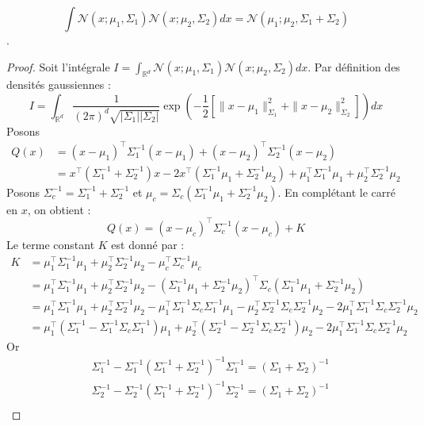 \documentclass[12pt]{article}
\begin{document}
\begin{lemma}
    \label{lem:prod_gaussians}
    $$\int \mathcal{N}(x; \mu_1, \Sigma_1) \mathcal{N}(x; \mu_2, \Sigma_2) dx = \mathcal{N}(\mu_1; \mu_2, \Sigma_1 + \Sigma_2)$$.
\end{lemma}
\begin{proof}
Soit l'intégrale $I = \int_{\mathbb{R}^d} \mathcal{N}(x; \mu_1, \Sigma_1) \mathcal{N}(x; \mu_2, \Sigma_2) dx$. Par définition des densités gaussiennes :
$$
I = \int_{\mathbb{R}^d} \frac{1}{(2\pi)^d \sqrt{|\Sigma_1||\Sigma_2|}} \exp \left( -\frac{1}{2} \left[ \|x-\mu_1\|_{\Sigma_1}^2 + \|x-\mu_2\|_{\Sigma_2}^2 \right] \right) dx
$$
Posons
\begin{align*}
Q(x) &= (x-\mu_1)^\top \Sigma_1^{-1} (x-\mu_1) + (x-\mu_2)^\top \Sigma_2^{-1} (x-\mu_2) \\
&= x^\top (\Sigma_1^{-1} + \Sigma_2^{-1}) x - 2x^\top (\Sigma_1^{-1}\mu_1 + \Sigma_2^{-1}\mu_2) + \mu_1^\top \Sigma_1^{-1} \mu_1 + \mu_2^\top \Sigma_2^{-1} \mu_2
\end{align*}
Posons $\Sigma_c^{-1} = \Sigma_1^{-1} + \Sigma_2^{-1}$ et $\mu_c = \Sigma_c (\Sigma_1^{-1}\mu_1 + \Sigma_2^{-1}\mu_2)$. En complétant le carré en $x$, on obtient :
$$
Q(x) = (x-\mu_c)^\top \Sigma_c^{-1} (x-\mu_c) + K
$$
Le terme constant $K$ est donné par :
\begin{align*}
K &= \mu_1^\top \Sigma_1^{-1} \mu_1 + \mu_2^\top \Sigma_2^{-1} \mu_2 - \mu_c^\top \Sigma_c^{-1} \mu_c\\
&= \mu_1^\top \Sigma_1^{-1} \mu_1 + \mu_2^\top \Sigma_2^{-1} \mu_2 
- (\Sigma_1^{-1}\mu_1 + \Sigma_2^{-1}\mu_2)^\top \Sigma_c (\Sigma_1^{-1}\mu_1 + \Sigma_2^{-1}\mu_2) \\
&= \mu_1^\top \Sigma_1^{-1} \mu_1 + \mu_2^\top \Sigma_2^{-1} \mu_2
- \mu_1^\top \Sigma_1^{-1} \Sigma_c \Sigma_1^{-1} \mu_1
- \mu_2^\top \Sigma_2^{-1} \Sigma_c \Sigma_2^{-1} \mu_2
- 2 \mu_1^\top \Sigma_1^{-1} \Sigma_c \Sigma_2^{-1} \mu_2\\
&= \mu_1^\top \left( \Sigma_1^{-1} - \Sigma_1^{-1} \Sigma_c \Sigma_1^{-1} \right) \mu_1 
+ \mu_2^\top \left( \Sigma_2^{-1} - \Sigma_2^{-1} \Sigma_c \Sigma_2^{-1} \right) \mu_2
- 2 \mu_1^\top \Sigma_1^{-1} \Sigma_c \Sigma_2^{-1} \mu_2
\end{align*}
Or 
\begin{align*}
 & \Sigma_1^{-1} - \Sigma_1^{-1}(\Sigma_1^{-1} + \Sigma_2^{-1})^{-1}\Sigma_1^{-1} = (\Sigma_1 + \Sigma_2)^{-1}\\
 & \Sigma_2^{-1} - \Sigma_2^{-1}(\Sigma_1^{-1} + \Sigma_2^{-1})^{-1}\Sigma_2^{-1} = (\Sigma_1 + \Sigma_2)^{-1}\\

\end{align*}
\end{proof}
\end{document}
